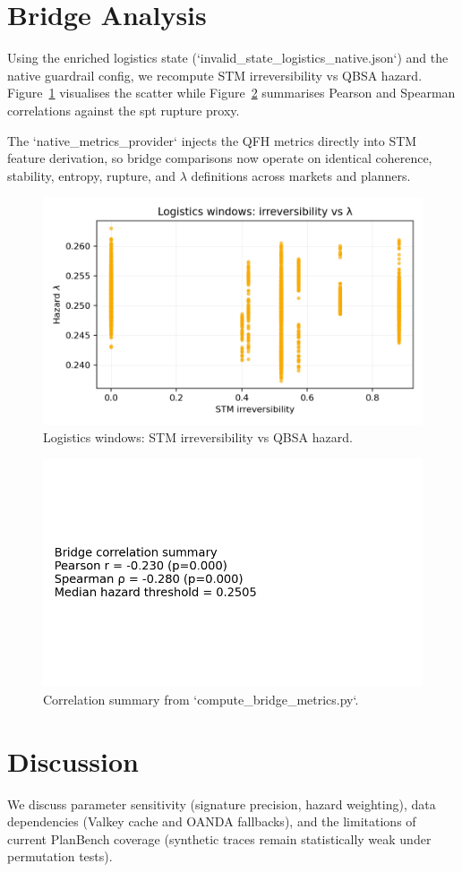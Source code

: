 \documentclass[11pt]{article}
\begin{document}
\section{Bridge Analysis}
Using the enriched logistics state (`invalid\_state\_logistics\_native.json`) and the native guardrail config, we recompute STM irreversibility vs QBSA hazard. Figure~\ref{fig:logistics-irr-lambda} visualises the scatter while Figure~\ref{fig:bridge-summary} summarises Pearson and Spearman correlations against the spt rupture proxy.

The `native_metrics_provider` injects the QFH metrics directly into STM feature derivation, so bridge comparisons now operate on identical coherence, stability, entropy, rupture, and $\lambda$ definitions across markets and planners.

\begin{figure}[t]
  \centering
  \includegraphics[width=0.75\linewidth]{../figures/fig3_logistics_irreversibility_vs_lambda.png}
  \caption{Logistics windows: STM irreversibility vs QBSA hazard.}
  \label{fig:logistics-irr-lambda}
\end{figure}

\begin{figure}[t]
  \centering
  \includegraphics[width=0.5\linewidth]{../figures/fig4_bridge_correlation_summary.png}
  \caption{Correlation summary from `compute_bridge_metrics.py`.}
  \label{fig:bridge-summary}
\end{figure}

\section{Discussion}
We discuss parameter sensitivity (signature precision, hazard weighting), data dependencies (Valkey cache and OANDA fallbacks), and the limitations of current PlanBench coverage (synthetic traces remain statistically weak under permutation tests).
\end{document}
